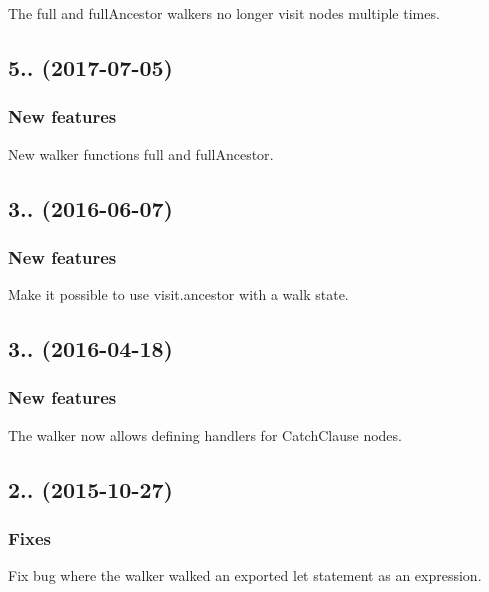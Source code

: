 The {\ttfamily full} and {\ttfamily full\+Ancestor} walkers no longer visit nodes multiple times.

\subsection*{5.. (2017-\/07-\/05)}

\subsubsection*{New features}

New walker functions {\ttfamily full} and {\ttfamily full\+Ancestor}.

\subsection*{3.. (2016-\/06-\/07)}

\subsubsection*{New features}

Make it possible to use {\ttfamily visit.\+ancestor} with a walk state.

\subsection*{3.. (2016-\/04-\/18)}

\subsubsection*{New features}

The walker now allows defining handlers for {\ttfamily Catch\+Clause} nodes.

\subsection*{2.. (2015-\/10-\/27)}

\subsubsection*{Fixes}

Fix bug where the walker walked an exported {\ttfamily let} statement as an expression. 